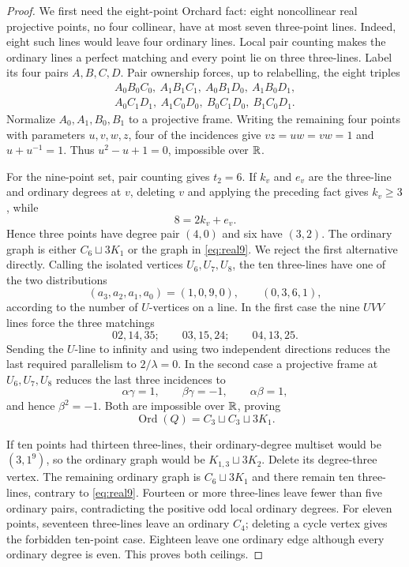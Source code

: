 \begin{proof}
We first need the eight-point Orchard fact: eight noncollinear real
projective points, no four collinear, have at most seven three-point lines.
Indeed, eight such lines would leave four ordinary lines.  Local pair
counting makes the ordinary lines a perfect matching and every point lie on
three three-lines.  Label its four pairs $A,B,C,D$.  Pair ownership forces,
up to relabelling, the eight triples
\[
\begin{gathered}
A_0B_0C_0,\ A_1B_1C_1,\ A_0B_1D_0,\ A_1B_0D_1,\\
A_0C_1D_1,\ A_1C_0D_0,\ B_0C_1D_0,\ B_1C_0D_1.
\end{gathered}
\]
Normalize $A_0,A_1,B_0,B_1$ to a projective frame.  Writing the remaining
four points with parameters $u,v,w,z$, four of the incidences give
$vz=uw=vw=1$ and $u+u^{-1}=1$.  Thus $u^2-u+1=0$, impossible over $\mathbb{R}$.

For the nine-point set, pair counting gives $t_2=6$.  If $k_v$ and $e_v$
are the three-line and ordinary degrees at $v$, deleting $v$ and applying
the preceding fact gives $k_v\ge3$, while
\[
 8=2k_v+e_v.
\]
Hence three points have degree pair $(4,0)$ and six have $(3,2)$.  The
ordinary graph is either $C_6\sqcup3K_1$ or the graph in \eqref{eq:real9}.
We reject the first alternative directly.  Calling the isolated vertices
$U_6,U_7,U_8$, the ten three-lines have one of the two distributions
\[
 (a_3,a_2,a_1,a_0)=(1,0,9,0),\qquad(0,3,6,1),
\]
according to the number of $U$-vertices on a line.  In the first case the
nine $UVV$ lines force the three matchings
\[
 02,14,35;\qquad03,15,24;\qquad04,13,25.
\]
Sending the $U$-line to infinity and using two independent directions
reduces the last required parallelism to $2/\lambda=0$.  In the second
case a projective frame at $U_6,U_7,U_8$ reduces the last three incidences
to
\[
 \alpha\gamma=1,\qquad\beta\gamma=-1,\qquad
 \alpha\beta=1,
\]
and hence $\beta^2=-1$.  Both are impossible over $\mathbb{R}$, proving
\begin{equation}\label{eq:real9}
\operatorname{Ord}(Q)=C_3\sqcup C_3\sqcup3K_1.
\end{equation}

If ten points had thirteen three-lines, their ordinary-degree multiset
would be $(3,1^9)$, so the ordinary graph would be
$K_{1,3}\sqcup3K_2$.  Delete its degree-three vertex.  The remaining
ordinary graph is $C_6\sqcup3K_1$ and there remain ten three-lines,
contrary to \eqref{eq:real9}.  Fourteen or more three-lines leave fewer
than five ordinary pairs, contradicting the positive odd local ordinary
degrees.  For eleven points, seventeen three-lines leave an ordinary
$C_4$; deleting a cycle vertex gives the forbidden ten-point case.
Eighteen leave one ordinary edge although every ordinary degree is even.
This proves both ceilings.
\end{proof}

